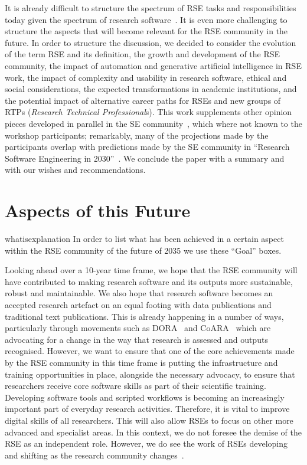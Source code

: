 \documentclass{eceasst}
\begin{document}
It is already difficult to structure the spectrum of RSE tasks and responsibilities
today given the spectrum of research software~\cite{Hasselbring2024}.
It is even more challenging to structure the aspects that will become relevant for the RSE community in the future.
In order to structure the discussion, we decided to consider
the evolution of the term RSE and its definition,
the growth and development of the RSE community,
the impact of automation and generative artificial intelligence in RSE work,
the impact of complexity and usability in research software,
ethical and social considerations,
the expected transformations in academic institutions,
and the potential impact of alternative career paths for RSEs
and new groups of RTPs (\emph{Research Technical Professional}s).
This work supplements other opinion pieces developed in parallel
in the SE community~\cite{ChueHong2025,Sochat2024Infra,Bencomo2024AEBoK,OliveiraJr2024,Druskat2025,Carleton2022},
which where not known to the workshop participants; remarkably,
many of the projections made by the participants overlap with predictions made
by the SE community in ``Research Software Engineering in 2030''~\cite{Katz2023}.
We conclude the paper with a summary and with our wishes and recommendations.

\section{Aspects of this Future}
\begin{whatis}{}{whatisexplanation}
In order to list what has been achieved in a certain aspect within the RSE community of the future of 2035 we use these ``Goal'' boxes.
\end{whatis}

Looking ahead over a 10-year time frame, we hope that the RSE community will have
contributed to making research software and its outputs
more sustainable, robust and maintainable.
We also hope that research software becomes an accepted research artefact on an equal footing with data publications and traditional text publications.
This is already happening in a number of ways,
particularly through movements such as DORA~\cite{DORA} and CoARA~\cite{COARA} which are advocating for a change in the way that research is assessed and outputs recognised.
However, we want to ensure that one of the core achievements made by the RSE community in this time
frame is putting the infrastructure and training opportunities in place, alongside the necessary
advocacy, to ensure that researchers receive core software skills as part of their scientific training.
Developing software tools and scripted workflows is becoming an increasingly important part of everyday
research activities.
Therefore, it is vital to improve digital skills of all researchers.
This will also allow RSEs to focus on other more advanced and specialist areas.
In this context, we do not foresee the demise of the RSE as an independent role.
However, we do see the work of RSEs developing and shifting as the research community changes~\cite{ChueHong2025}.
\end{document}
